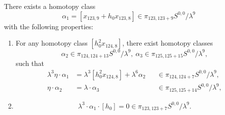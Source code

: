 \begin{lemma} \label{lem:x1239}
    There exists a homotopy class
    $$\alpha_1 = [x_{123,9}+h_0x_{123,8}] \in \pi_{123,123+9} S^{0,0}/\lambda^9$$
    with the following properties:
    \begin{enumerate}
    \item For any homotopy class $[h_0^2 x_{124,8}]$, there exist homotopy classes 
    $$\alpha_2 \in \pi_{124,124+13} S^{0,0}/\lambda^9, \ \alpha_3 \in \pi_{125,125+15} S^{0,0}/\lambda^9,$$ 
    such that 
    \begin{align*}
        \lambda^3 \eta \cdot \alpha_1 & = \lambda^3 [h_0^2 x_{124,8}] + 
\lambda^6 \alpha_2 && \in \pi_{124,124+7} S^{0,0}/\lambda^9,\\
\eta \cdot \alpha_2 & = \lambda \cdot \alpha_3 && \in \pi_{125,125+14} S^{0,0}/\lambda^9,
    \end{align*}
\item \leavevmode\vspace*{-\dimexpr\abovedisplayskip + \baselineskip} 
$$\lambda^3 \cdot \alpha_1 \cdot [h_0] = 0 \in \pi_{123,123+7} S^{0,0}/\lambda^9.$$
    \end{enumerate}
\end{lemma}

